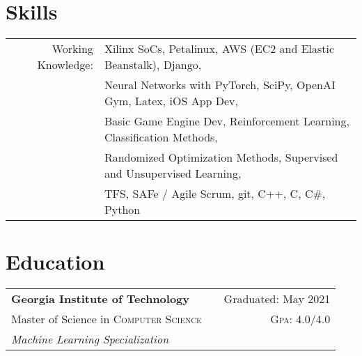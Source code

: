 \documentclass[a4paper,11pt]{article}
\begin{document}

\pagestyle{empty} %

\par{ \smallskip\par}



\section{Skills}
\begin{tabularx}{\textwidth}{rl}
   Working Knowledge: & Xilinx SoCs, Petalinux, AWS (EC2 and Elastic Beanstalk), Django, \\
                                     & Neural Networks with PyTorch, SciPy, OpenAI Gym, Latex, iOS App Dev, \\
                                     & Basic Game Engine Dev, Reinforcement Learning, Classification Methods, \\
                                     & Randomized Optimization Methods, Supervised and Unsupervised Learning, \\
                                     & TFS, SAFe / Agile Scrum, git, C++, C, C\#, Python\\
\end{tabularx}

\hfill
\section{Education}
\begin{tabularx}{\textwidth}{lXr}
   \textbf{Georgia Institute of Technology} & & Graduated: May 2021\\
   Master of Science in \textsc{Computer Science} & & \normalsize \textsc{Gpa}: 4.0/4.0\\
   \emph{Machine Learning Specialization}
\end{tabularx}
\end{document}
